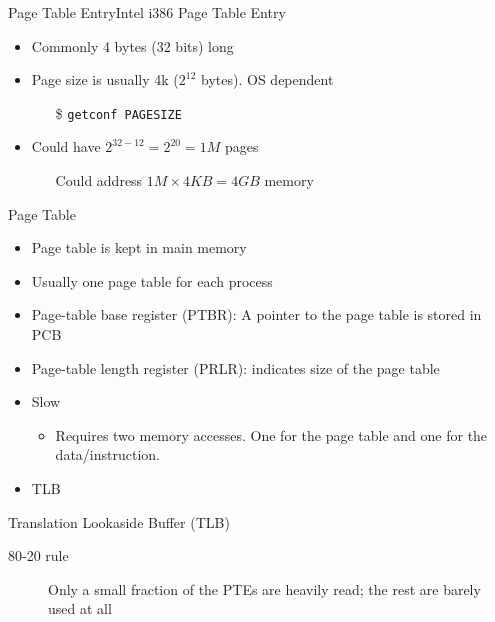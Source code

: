 \begin{frame}{Page Table Entry}{Intel i386 Page Table Entry}
  \begin{itemize}
  \item Commonly 4 bytes (32 bits) long
  \item Page size is usually 4k ($2^{12}$ bytes). OS dependent
    \begin{itemize}
    \item[\$] \texttt{getconf PAGESIZE}
    \end{itemize}
  \item Could have $2^{32-12}=2^{20}=1M$ pages
    \begin{itemize}
    \item[] Could address $1M\times{}4KB=4GB$ memory
    \end{itemize}
  \end{itemize}
  \begin{center}
  \end{center}
\end{frame}

\begin{frame}{Page Table}
  \begin{itemize}
  \item Page table is kept in main memory
  \item Usually one page table for each process
  \item \alert{Page-table base register (PTBR):} A pointer to the page table is stored in
    PCB
  \item \alert{Page-table length register (PRLR):} indicates size of the page table
  \item Slow
    \begin{itemize}
    \item Requires two memory accesses. One for the page table and one for the
      data/instruction.
    \end{itemize}
  \item TLB
  \end{itemize}
\end{frame}

\begin{frame}{Translation Lookaside Buffer (TLB)}
  \begin{description}
  \item[80-20 rule] Only a small fraction of the PTEs are heavily read; the rest are
    barely used at all
  \end{description}
  \begin{center}
  \end{center}
\end{frame}

